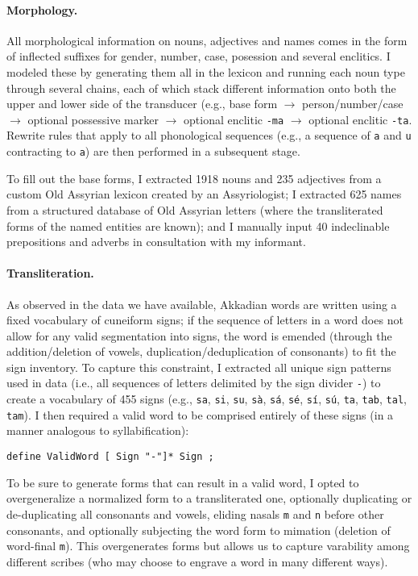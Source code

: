 \documentclass[11pt,letterpaper]{article}
\begin{document}
\paragraph{Morphology.}All morphological information on nouns, adjectives and names comes in the form of inflected suffixes for gender, number, case, posession and several enclitics.  I modeled these by generating them all in the lexicon and running each noun type through several chains, each of which stack different information onto both the upper and lower side of the transducer (e.g., base form $\rightarrow$ person/number/case $\rightarrow$ optional possessive marker $\rightarrow$ optional enclitic \texttt{-ma} $\rightarrow$ optional enclitic \texttt{-ta}.  Rewrite rules that apply to all phonological sequences (e.g., a sequence of \texttt{a} and \texttt{u} contracting to \texttt{a}) are then performed in a subsequent stage.

To fill out the base forms, I extracted 1918 nouns and 235 adjectives from a custom Old Assyrian lexicon created by an Assyriologist; I extracted 625 names from a structured database of Old Assyrian letters (where the transliterated forms of the named entities are known); and I manually input 40 indeclinable prepositions and adverbs in consultation with my informant.

\paragraph{Transliteration.} As observed in the data we have available, Akkadian words are written using a fixed vocabulary of cuneiform signs; if the sequence of letters in a word does not allow for any valid segmentation into signs, the word is emended (through the addition/deletion of vowels, duplication/deduplication of consonants) to fit the sign inventory.  To capture this constraint, I extracted all unique sign patterns used in data (i.e., all sequences of letters delimited by the sign divider \texttt{-}) to create a vocabulary of 455 signs (e.g., \texttt{sa}, \texttt{si}, \texttt{su}, \texttt{sà}, \texttt{sá}, \texttt{sé}, \texttt{sí}, \texttt{sú}, \texttt{ta}, \texttt{tab}, \texttt{tal}, \texttt{tam}).  I then required a valid word to be comprised entirely of these signs (in a manner analogous to syllabification):

\begin{verbatim}
define ValidWord [ Sign "-"]* Sign ;
\end{verbatim}

To be sure to generate forms that can result in a valid word, I opted to overgeneralize a normalized form to a transliterated one, optionally duplicating or de-duplicating all consonants and vowels, eliding nasals \texttt{m} and \texttt{n} before other consonants, and optionally subjecting the word form to mimation (deletion of word-final \texttt{m}).  This overgenerates forms but allows us to capture varability among different scribes (who may choose to engrave a word in many different ways).
\end{document}

